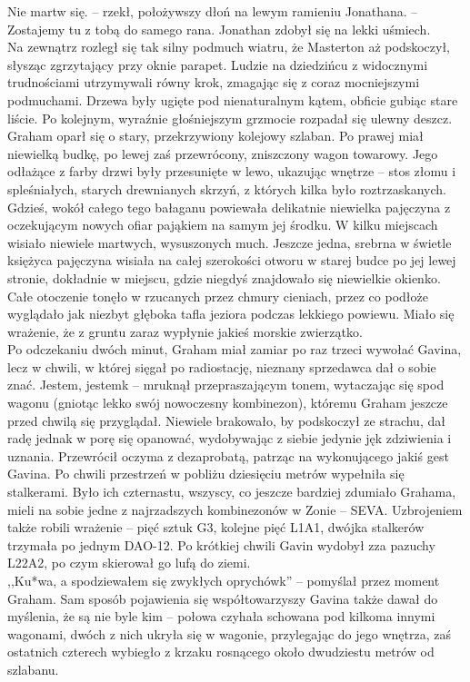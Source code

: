 \documentclass[../MAIN.tex]{subfiles}
\begin{document}
\sx Nie martw się. -- rzekł, położywszy dłoń na lewym ramieniu Jonathana. -- Zostajemy tu z tobą do samego rana.
\qd
Jonathan zdobył się na lekki uśmiech.\\
Na zewnątrz rozległ się tak silny podmuch wiatru, że Masterton aż podskoczył, słysząc zgrzytający przy oknie parapet. Ludzie na dziedzińcu z widocznymi trudnościami utrzymywali równy krok, zmagając się z coraz mocniejszymi podmuchami. Drzewa były ugięte pod nienaturalnym kątem, obficie gubiąc stare liście. Po kolejnym, wyraźnie głośniejszym grzmocie rozpadał się ulewny deszcz.
% 
% 
Graham oparł się o stary, przekrzywiony kolejowy szlaban. Po prawej miał niewielką budkę, po lewej zaś przewrócony, zniszczony wagon towarowy. Jego odłażące z farby drzwi były przesunięte w lewo, ukazując wnętrze -- stos złomu i spleśniałych, starych drewnianych skrzyń, z których kilka było roztrzaskanych. Gdzieś, wokół całego tego bałaganu powiewała delikatnie niewielka pajęczyna z oczekującym nowych ofiar pająkiem na samym jej środku. W kilku miejscach wisiało niewiele martwych, wysuszonych much. Jeszcze jedna, srebrna w świetle księżyca pajęczyna wisiała na całej szerokości otworu w starej budce po jej lewej stronie, dokładnie w miejscu, gdzie niegdyś znajdowało się niewielkie okienko. Całe otoczenie tonęło w rzucanych przez chmury cieniach, przez co podłoże wyglądało jak niezbyt głęboka tafla jeziora podczas lekkiego powiewu. Miało się wrażenie, że z gruntu zaraz wypłynie jakieś morskie zwierzątko.\\
Po odczekaniu dwóch minut, Graham miał zamiar po raz trzeci wywołać Gavina, lecz w chwili, w której sięgał po radiostację, nieznany sprzedawca dał o sobie znać.
\sx Jestem, jestem\3k -- mruknął przepraszającym tonem, wytaczając się spod wagonu (gniotąc lekko swój nowoczesny kombinezon), któremu Graham jeszcze przed chwilą się przyglądał. 
\qd
Niewiele brakowało, by podskoczył ze strachu, dał radę jednak w porę się opanować, wydobywając z siebie jedynie jęk zdziwienia i uznania. Przewrócił oczyma z dezaprobatą, patrząc na wykonującego jakiś gest Gavina. Po chwili przestrzeń w pobliżu dziesięciu metrów wypełniła się stalkerami. Było ich czternastu, wszyscy, co jeszcze bardziej zdumiało Grahama, mieli na sobie jedne z najrzadszych kombinezonów w Zonie -- SEVA. Uzbrojeniem także robili wrażenie -- pięć sztuk G3, kolejne pięć L1A1, dwójka stalkerów trzymała po jednym DAO-12. Po krótkiej chwili Gavin wydobył zza pazuchy L22A2, po czym skierował go lufą do ziemi.\\
,,Ku*wa, a spodziewałem się zwykłych oprychów\3k'' -- pomyślał przez moment Graham. Sam sposób pojawienia się współtowarzyszy Gavina także dawał do myślenia, że są nie byle kim -- połowa czyhała schowana pod kilkoma innymi wagonami, dwóch z nich ukryła się w wagonie, przylegając do jego wnętrza, zaś ostatnich czterech wybiegło z krzaku rosnącego około dwudziestu metrów od szlabanu.
\end{document}
